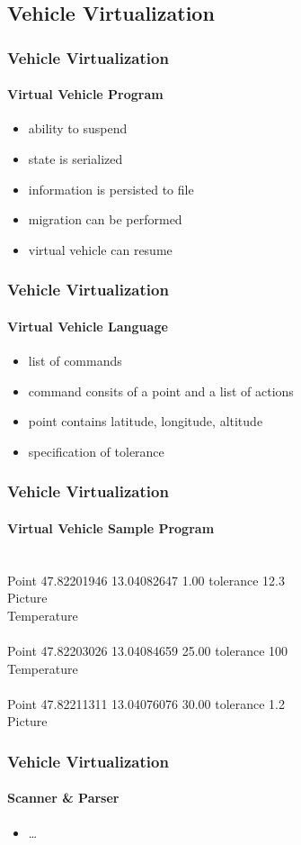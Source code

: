 \documentclass{beamer}
\begin{document}
\subsection{Vehicle Virtualization}

\begin{frame}\frametitle{Vehicle Virtualization}\framesubtitle{Virtual Vehicle Program}
\begin{itemize}
\item ability to suspend
\item state is serialized
\item information is persisted to file
\item migration can be performed
\item virtual vehicle can resume
\end{itemize} 
\end{frame}

\begin{frame}\frametitle{Vehicle Virtualization}\framesubtitle{Virtual Vehicle Language}
\begin{itemize}
\item list of commands
\item command consits of a point and a list of actions
\item point contains latitude, longitude, altitude
\item specification of tolerance
\end{itemize} 
\end{frame}

\begin{frame}\frametitle{Vehicle Virtualization}\framesubtitle{Virtual Vehicle Sample Program}
\\
Point 47.82201946 13.04082647 1.00 tolerance 12.3\\
Picture \\
Temperature\\
\\
Point 47.82203026 13.04084659 25.00 tolerance 100 \\
Temperature\\
\\
Point 47.82211311 13.04076076 30.00 tolerance 1.2\\
Picture
\end{frame}

\begin{frame}\frametitle{Vehicle Virtualization}\framesubtitle{Scanner \& Parser}
\begin{itemize}
\item \ldots
\end{itemize} 
\end{frame}
\end{document}
